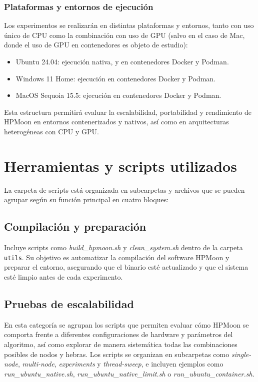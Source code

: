 \subsubsection{Plataformas y entornos de ejecución}

Los experimentos se realizarán en distintas plataformas y entornos, tanto con uso único de CPU como la combinación con uso de GPU (salvo en el caso de Mac, donde el uso de GPU en contenedores es objeto de estudio):

\begin{itemize}
    \item Ubuntu 24.04: ejecución nativa, y en contenedores Docker y Podman.
    \item Windows 11 Home: ejecución en contenedores Docker y Podman.
    \item MacOS Sequoia 15.5: ejecución en contenedores Docker y Podman.
\end{itemize}

Esta estructura permitirá evaluar la escalabilidad, portabilidad y rendimiento de HPMoon en entornos contenerizados y nativos, así como en arquitecturas heterogéneas con CPU y GPU.

\section{Herramientas y scripts utilizados}\label{sec:herramientas_scripts}

La carpeta de scripts está organizada en subcarpetas y archivos que se pueden agrupar según su función principal en cuatro bloques:

\subsection{Compilación y preparación}
Incluye scripts como \textit{build\_hpmoon.sh} y \textit{clean\_system.sh} dentro de la carpeta \texttt{utils}. Su objetivo es automatizar la compilación del software HPMoon y preparar el entorno, asegurando que el binario esté actualizado y que el sistema esté limpio antes de cada experimento.

\subsection{Pruebas de escalabilidad}

En esta categoría se agrupan los scripts que permiten evaluar cómo HPMoon se comporta frente a diferentes configuraciones de hardware y parámetros del algoritmo, así como explorar de manera sistemática todas las combinaciones posibles de nodos y hebras. Los scripts se organizan en subcarpetas como \textit{single-node}, \textit{multi-node}, \textit{experiments} y \textit{thread-sweep}, e incluyen ejemplos como \textit{run\_ubuntu\_native.sh}, \textit{run\_ubuntu\_native\_limit.sh} o \textit{run\_ubuntu\_container.sh}.

